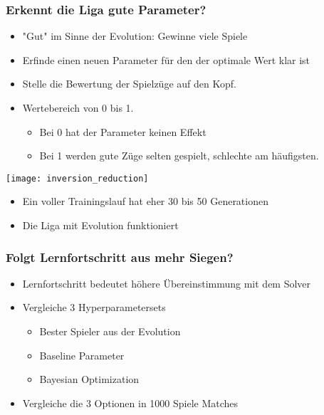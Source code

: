 \begin{frame}
 \frametitle{Erkennt die Liga gute Parameter?}
  


\begin{itemize}
  \item \pause "Gut" im Sinne der Evolution: Gewinne viele Spiele
  \item \pause Erfinde einen neuen Parameter für den der optimale Wert klar ist
  \item \pause Stelle die Bewertung der Spielzüge auf den Kopf.
  \item \pause Wertebereich von 0 bis 1.
\begin{itemize}
  \item \pause Bei 0 hat der Parameter keinen Effekt
  \item \pause Bei 1 werden gute Züge selten gespielt, schlechte am häufigsten.
\end{itemize}
\end{itemize}
\pause \center \texttt{[image: inversion\_reduction]}
\begin{itemize}
  \item \pause Ein voller Trainingslauf hat eher 30 bis 50 Generationen
  \item \pause Die Liga mit Evolution funktioniert
\end{itemize}

  
\end{frame}
\begin{frame}
 \frametitle{Folgt Lernfortschritt aus mehr Siegen?}
  


\begin{itemize}
  \item \pause Lernfortschritt bedeutet höhere Übereinstimmung mit dem Solver
  \item \pause Vergleiche 3 Hyperparametersets
\begin{itemize}
  \item \pause Bester Spieler aus der Evolution
  \item \pause Baseline Parameter
  \item \pause Bayesian Optimization
\end{itemize}
  \item \pause Vergleiche die 3 Optionen in 1000 Spiele Matches
\end{itemize}

  
\end{frame}
